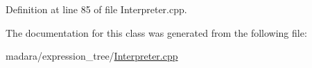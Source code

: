 Definition at line 85 of file Interpreter.cpp.



The documentation for this class was generated from the following file:\begin{DoxyCompactItemize}
\item 
madara/expression\_\-tree/\hyperlink{Interpreter_8cpp}{Interpreter.cpp}\end{DoxyCompactItemize}
